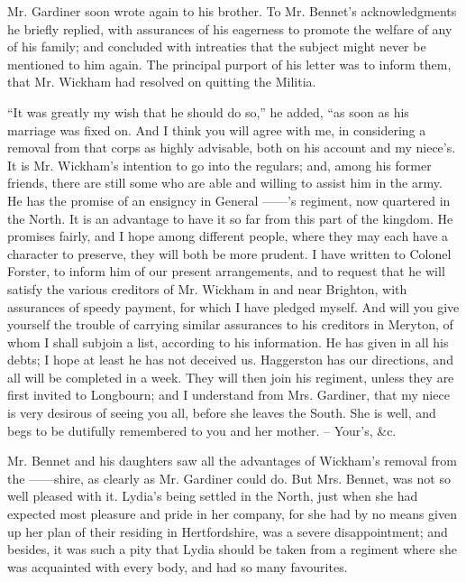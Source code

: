 \strut

Mr. Gardiner soon wrote again to his brother. To
Mr. Bennet’s acknowledgments he briefly replied, with
assurances of his eagerness to promote the welfare of any
of his family; and concluded with intreaties that the
subject might never be mentioned to him again. The
principal purport of his letter was to inform them, that
Mr. Wickham had resolved on quitting the Militia.

“It was greatly my wish that he should do so,” he
added, “as soon as his marriage was fixed on. And
I think you will agree with me, in considering a removal
from that corps as highly advisable, both on his account
and my niece’s. It is Mr. Wickham’s intention to go into
the regulars; and, among his former friends, there are
still some who are able and willing to assist him in the
army. He has the promise of an ensigncy in General
------’s regiment, now quartered in the North. It is an
advantage to have it so far from this part of the kingdom.
He promises fairly, and I hope among different people,
where they may each have a character to preserve, they
will both be more prudent. I have written to Colonel
Forster, to inform him of our present arrangements, and
to request that he will satisfy the various creditors of
Mr. Wickham in and near Brighton, with assurances of
speedy payment, for which I have pledged myself. And
will you give yourself the trouble of carrying similar
assurances to his creditors in Meryton, of whom I shall
subjoin a list, according to his information. He has
given in all his debts; I hope at least he has not deceived
us. Haggerston has our directions, and all will be completed
in a week. They will then join his regiment, unless
they are first invited to Longbourn; and I understand
from Mrs. Gardiner, that my niece is very desirous of
seeing you all, before she leaves the South. She is well,
and begs to be dutifully remembered to you and her
mother. -- Your’s, \&c.


\strut

Mr. Bennet and his daughters saw all the advantages
of Wickham’s removal from the ------shire, as clearly as
Mr. Gardiner could do. But Mrs. Bennet, was not so well
pleased with it. Lydia’s being settled in the North, just
when she had expected most pleasure and pride in her
company, for she had by no means given up her plan of
their residing in Hertfordshire, was a severe disappointment;
and besides, it was such a pity that Lydia should
be taken from a regiment where she was acquainted with
every body, and had so many favourites.


